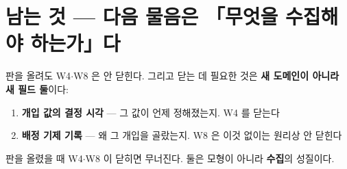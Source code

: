 \documentclass{article}
\begin{document}
\section{남는 것 --- 다음 물음은 「무엇을 수집해야 하는가」다}

판을 올려도 W4$\cdot$W8 은 안 닫힌다. 그리고 닫는 데 필요한 것은
\textbf{새 도메인이 아니라 새 필드 둘}이다:

\begin{enumerate}
\item \textbf{개입 값의 결정 시각} --- 그 값이 언제 정해졌는지. W4 를 닫는다
\item \textbf{배정 기제 기록} --- 왜 그 개입을 골랐는지. W8 은 이것 없이는 원리상 안 닫힌다
\end{enumerate}

{판을 올렸을 때 W4$\cdot$W8 이 닫히면 무너진다. 둘은 모형이 아니라 \textbf{수집}의 성질이다.}
\end{document}
